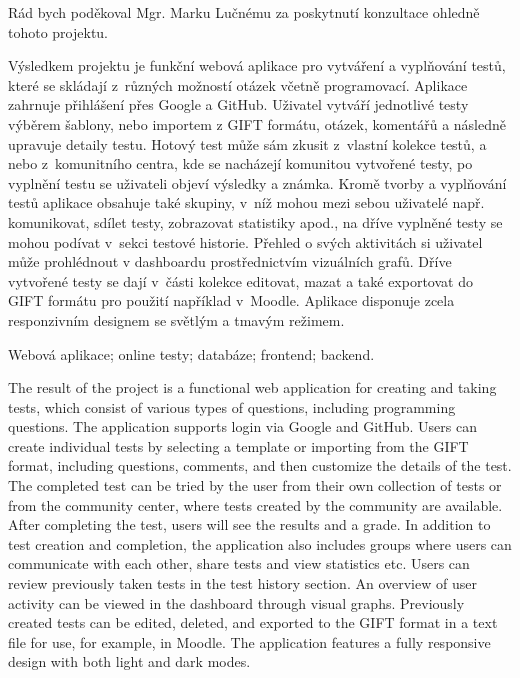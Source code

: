 \documentclass[12pt, a4paper,
openright
]{report}
\begin{document}
\noindent
Rád bych poděkoval Mgr. Marku Lučnému za poskytnutí konzultace ohledně tohoto projektu.

\cleardoublepage


\noindent Výsledkem projektu je funkční webová aplikace pro vytváření a vyplňování testů, které se skládají z~různých možností otázek včetně programovací. Aplikace zahrnuje přihlášení přes Google a GitHub. Uživatel vytváří jednotlivé testy výběrem šablony, nebo importem z GIFT formátu, otázek, komentářů a následně upravuje detaily testu. Hotový test může sám zkusit z~vlastní kolekce testů, a nebo z~komunitního centra, kde se nacházejí komunitou vytvořené testy, po vyplnění testu se uživateli objeví výsledky a známka. Kromě tvorby a vyplňování testů aplikace obsahuje také skupiny, v~níž mohou mezi sebou uživatelé např. komunikovat, sdílet testy, zobrazovat statistiky apod., na dříve vyplněné testy se mohou podívat v~sekci testové historie. Přehled o svých aktivitách si uživatel může prohlédnout v dashboardu prostřednictvím vizuálních grafů. Dříve vytvořené testy se dají v~části kolekce editovat, mazat a také exportovat do GIFT formátu pro použití například v~Moodle. Aplikace disponuje zcela responzivním designem se světlým a tmavým režimem. 

\vspace{18pt}


\noindent Webová aplikace; online testy; databáze; frontend; backend.

\vspace{18pt}


\noindent The result of the project is a functional web application for creating and taking tests, which consist of various types of questions, including programming questions. The application supports login via Google and GitHub. Users can create individual tests by selecting a template or importing from the GIFT format, including questions, comments, and then customize the details of the test. The completed test can be tried by the user from their own collection of tests or from the community center, where tests created by the community are available. After completing the test, users will see the results and a grade. In addition to test creation and completion, the application also includes groups where users can communicate with each other, share tests and view statistics etc. Users can review previously taken tests in the test history section. An overview of user activity can be viewed in the dashboard through visual graphs. Previously created tests can be edited, deleted, and exported to the GIFT format in a text file for use, for example, in Moodle. The application features a fully responsive design with both light and dark modes.
\end{document}
